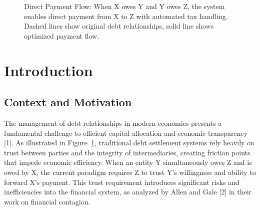 \documentclass[twocolumn,10pt,a4paper]{article}
\begin{document}
\begin{figure}[t]
\centering
{}
\caption{Direct Payment Flow: When X owes Y and Y owes Z, the system enables direct payment from X to Z with automated tax handling. Dashed lines show original debt relationships, solid line shows optimized payment flow.}
\label{fig:payment_flow}
\end{figure}

\section{Introduction}

\subsection{Context and Motivation}
The management of debt relationships in modern economies presents a fundamental challenge to efficient capital allocation and economic transparency [1]. As illustrated in Figure~\ref{fig:payment_flow}, traditional debt settlement systems rely heavily on trust between parties and the integrity of intermediaries, creating friction points that impede economic efficiency. When an entity Y simultaneously owes Z and is owed by X, the current paradigm requires Z to trust Y's willingness and ability to forward X's payment. This trust requirement introduces significant risks and inefficiencies into the financial system, as analyzed by Allen and Gale [2] in their work on financial contagion.
\end{document}
